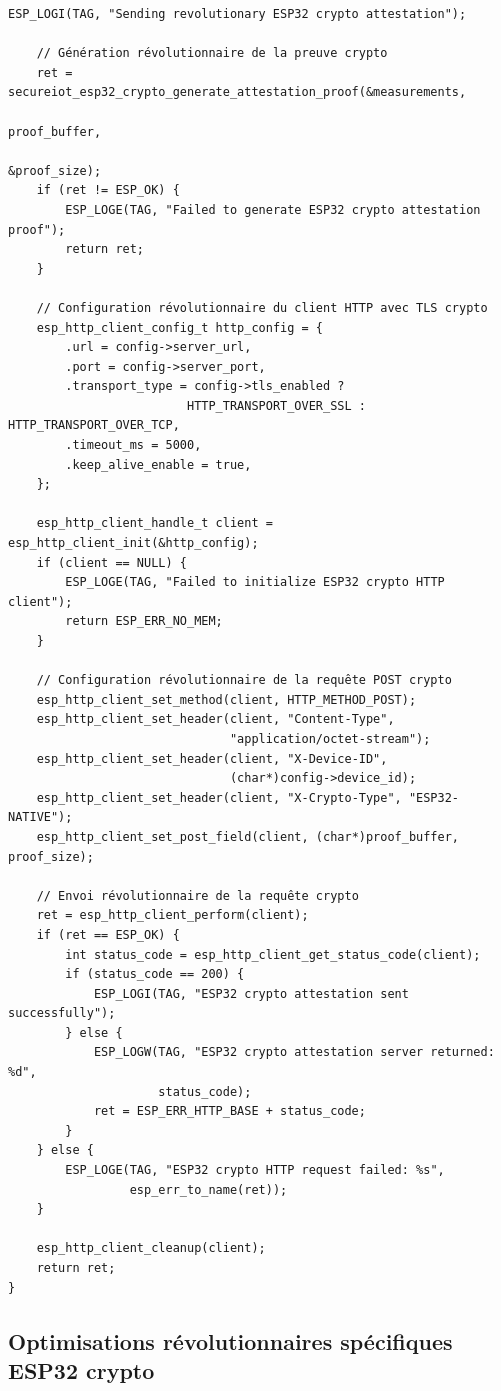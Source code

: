 \begin{lstlisting}[caption={Module révolutionnaire d'attestation ESP32 crypto intégré}]
    ESP_LOGI(TAG, "Sending revolutionary ESP32 crypto attestation");
    
    // Génération révolutionnaire de la preuve crypto
    ret = secureiot_esp32_crypto_generate_attestation_proof(&measurements, 
                                                           proof_buffer, 
                                                           &proof_size);
    if (ret != ESP_OK) {
        ESP_LOGE(TAG, "Failed to generate ESP32 crypto attestation proof");
        return ret;
    }
    
    // Configuration révolutionnaire du client HTTP avec TLS crypto
    esp_http_client_config_t http_config = {
        .url = config->server_url,
        .port = config->server_port,
        .transport_type = config->tls_enabled ? 
                         HTTP_TRANSPORT_OVER_SSL : HTTP_TRANSPORT_OVER_TCP,
        .timeout_ms = 5000,
        .keep_alive_enable = true,
    };
    
    esp_http_client_handle_t client = esp_http_client_init(&http_config);
    if (client == NULL) {
        ESP_LOGE(TAG, "Failed to initialize ESP32 crypto HTTP client");
        return ESP_ERR_NO_MEM;
    }
    
    // Configuration révolutionnaire de la requête POST crypto
    esp_http_client_set_method(client, HTTP_METHOD_POST);
    esp_http_client_set_header(client, "Content-Type", 
                               "application/octet-stream");
    esp_http_client_set_header(client, "X-Device-ID", 
                               (char*)config->device_id);
    esp_http_client_set_header(client, "X-Crypto-Type", "ESP32-NATIVE");
    esp_http_client_set_post_field(client, (char*)proof_buffer, proof_size);
    
    // Envoi révolutionnaire de la requête crypto
    ret = esp_http_client_perform(client);
    if (ret == ESP_OK) {
        int status_code = esp_http_client_get_status_code(client);
        if (status_code == 200) {
            ESP_LOGI(TAG, "ESP32 crypto attestation sent successfully");
        } else {
            ESP_LOGW(TAG, "ESP32 crypto attestation server returned: %d", 
                     status_code);
            ret = ESP_ERR_HTTP_BASE + status_code;
        }
    } else {
        ESP_LOGE(TAG, "ESP32 crypto HTTP request failed: %s", 
                 esp_err_to_name(ret));
    }
    
    esp_http_client_cleanup(client);
    return ret;
}
\end{lstlisting}

\subsection{Optimisations révolutionnaires spécifiques ESP32 crypto}

